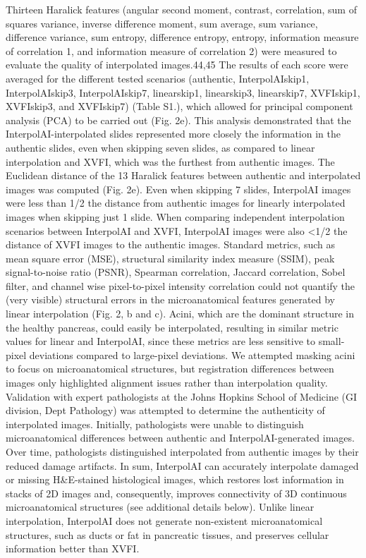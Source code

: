\begin{refsection}
    Thirteen Haralick features (angular second moment, contrast, correlation, sum of squares variance, inverse difference moment, sum average, sum variance, difference variance, sum entropy, difference entropy, entropy, information measure of correlation 1, and information measure of correlation 2) were measured to evaluate the quality of interpolated images.44,45 The results of each score were averaged for the different tested scenarios (authentic, InterpolAIskip1, InterpolAIskip3, InterpolAIskip7, linearskip1, linearskip3, linearskip7, XVFIskip1, XVFIskip3, and XVFIskip7) (Table S1.), which allowed for principal component analysis (PCA) to be carried out (Fig. 2e). This analysis demonstrated that the InterpolAI-interpolated slides represented more closely the information in the authentic slides, even when skipping seven slides, as compared to linear interpolation and XVFI, which was the furthest from authentic images. The Euclidean distance of the 13 Haralick features between authentic and interpolated images was computed (Fig. 2e). Even when skipping 7 slides, InterpolAI images were less than 1/2 the distance from authentic images for linearly interpolated images when skipping just 1 slide. When comparing independent interpolation scenarios between InterpolAI and XVFI, InterpolAI images were also <1/2 the distance of XVFI images to the authentic images.  
    Standard metrics, such as mean square error (MSE), structural similarity index measure (SSIM), peak signal-to-noise ratio (PSNR), Spearman correlation, Jaccard correlation, Sobel filter, and channel wise pixel-to-pixel intensity correlation could not quantify the (very visible) structural errors in the microanatomical features generated by linear interpolation (Fig. 2, b and c). Acini, which are the dominant structure in the healthy pancreas, could easily be interpolated, resulting in similar metric values for linear and InterpolAI, since these metrics are less sensitive to small-pixel deviations compared to large-pixel deviations. We attempted masking acini to focus on microanatomical structures, but registration differences between images only highlighted alignment issues rather than interpolation quality.
    Validation with expert pathologists at the Johns Hopkins School of Medicine (GI division, Dept Pathology) was attempted to determine the authenticity of interpolated images. Initially, pathologists were unable to distinguish microanatomical differences between authentic and InterpolAI-generated images. Over time, pathologists distinguished interpolated from authentic images by their reduced damage artifacts.
    In sum, InterpolAI can accurately interpolate damaged or missing H&E-stained histological images, which restores lost information in stacks of 2D images and, consequently, improves connectivity of 3D continuous microanatomical structures (see additional details below). Unlike linear interpolation, InterpolAI does not generate non-existent microanatomical structures, such as ducts or fat in pancreatic tissues, and preserves cellular information better than XVFI.
    

\end{refsection}
